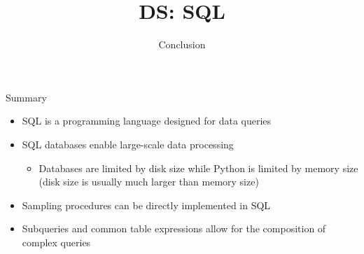 \documentclass[aspectratio=169]{../latex_main/tntbeamer}  %
\title[Introduction]{DS: SQL}
\subtitle{Conclusion}
\begin{document}
	
	\maketitle
	\begin{frame}[c]{Summary}
	    \begin{itemize}
	        \item SQL is a programming language designed for data queries
	        \item SQL databases enable large-scale data processing
	        \begin{itemize}
	            \item Databases are limited by disk size while Python is limited by memory size (disk size is usually much larger than memory size)
	        \end{itemize}
	        \item Sampling procedures can be directly implemented in SQL
	        \item Subqueries and common table expressions allow for the composition of complex queries
	    \end{itemize}
	\end{frame}
	
	
	
	
\end{document}
